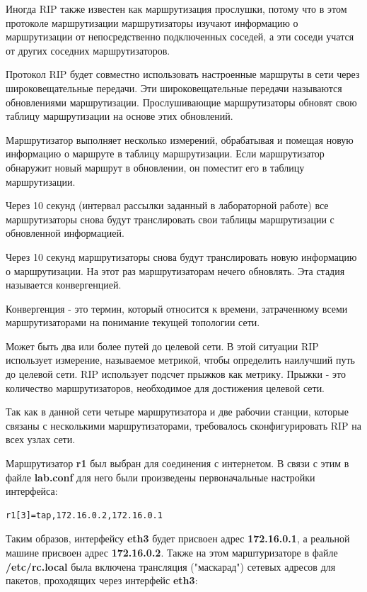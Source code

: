 \documentclass[a4paper,12pt]{article}
\begin{document}
Иногда RIP также известен как маршрутизация прослушки, потому что в этом протоколе маршрутизации маршрутизаторы изучают информацию о маршрутизации от непосредственно подключенных соседей, а эти соседи учатся от других соседних маршрутизаторов.

Протокол RIP будет совместно использовать настроенные маршруты в сети через широковещательные передачи. Эти широковещательные передачи называются обновлениями маршрутизации. Прослушивающие маршрутизаторы обновят свою таблицу маршрутизации на основе этих обновлений.

Маршрутизатор выполняет несколько измерений, обрабатывая и помещая новую информацию о маршруте в таблицу маршрутизации. Если маршрутизатор обнаружит новый маршрут в обновлении, он поместит его в таблицу маршрутизации.

Через 10 секунд (интервал рассылки заданный в лабораторной работе) все маршрутизаторы снова будут транслировать свои таблицы маршрутизации с обновленной информацией.

Через 10 секунд маршрутизаторы снова будут транслировать новую информацию о маршрутизации. На этот раз маршрутизаторам нечего обновлять. Эта стадия называется конвергенцией.

Конвергенция - это термин, который относится к времени, затраченному всеми маршрутизаторами на понимание текущей топологии сети.

Может быть два или более путей до целевой сети. В этой ситуации RIP использует измерение, называемое метрикой, чтобы определить наилучший путь до целевой сети. RIP использует подсчет прыжков как метрику. Прыжки - это количество маршрутизаторов, необходимое для достижения целевой сети.

Так как в данной сети четыре маршрутизатора и две рабочии станции, которые связаны с несколькими маршрутизаторами, требовалось сконфигурировать RIP на всех узлах сети.

Маршрутизатор \textbf{r1} был выбран для соединения с интернетом. В связи с этим в файле \textbf{lab.conf} для него были произведены первоначальные настройки интерфейса:

\begin{Verbatim}
r1[3]=tap,172.16.0.2,172.16.0.1
\end{Verbatim}

Таким образов, интерфейсу \textbf{eth3} будет присвоен адрес \textbf{172.16.0.1}, а реальной машине присвоен адрес \textbf{172.16.0.2}. Также на этом марштуризаторе в файле \textbf{/etc/rc.local} была включена трансляция ("маскарад") сетевых адресов для пакетов, проходящих через интерфейс \textbf{eth3}:
\end{document}
